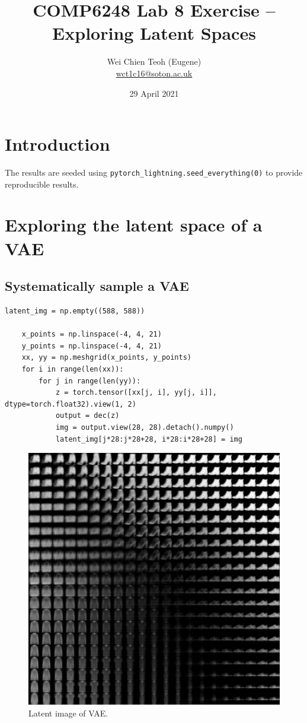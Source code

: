 \documentclass[twocolumn]{article}
\title{\Large COMP6248 Lab 8 Exercise -- Exploring Latent Spaces}
\author{\small Wei Chien Teoh (Eugene)\\\bigskip \href{mailto:wct1c16@soton.ac.uk}{wct1c16@soton.ac.uk}}
\date{\small 29 April 2021}
\begin{document}
\maketitle

\section*{Introduction}

The results are seeded using \lstinline{pytorch_lightning.seed_everything(0)} to provide reproducible results.

\section{Exploring the latent space of a VAE}

\subsection{Systematically sample a VAE}

\begin{lstlisting}[caption={Code to generate latent image.}]
    latent_img = np.empty((588, 588))

    x_points = np.linspace(-4, 4, 21)
    y_points = np.linspace(-4, 4, 21)
    xx, yy = np.meshgrid(x_points, y_points)
    for i in range(len(xx)):
        for j in range(len(yy)):
            z = torch.tensor([xx[j, i], yy[j, i]], dtype=torch.float32).view(1, 2)
            output = dec(z)
            img = output.view(28, 28).detach().numpy()
            latent_img[j*28:j*28+28, i*28:i*28+28] = img
\end{lstlisting}

\begin{figure}
    \includegraphics[width=\linewidth]{Figures/latent_img.pdf}
    \caption{Latent image of VAE.}
    \label{fig:latent-img}
\end{figure}
\end{document}
